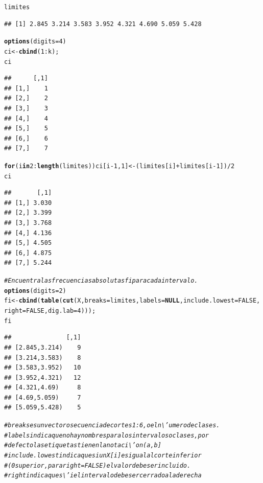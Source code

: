 \documentclass[12pt,letterpaper]{article}\usepackage[]{graphicx}\usepackage[]{color}
\makeatletter
\newcommand{\hlnum}[1]{\textcolor[rgb]{0.686,0.059,0.569}{#1}}%
\newcommand{\hlcom}[1]{\textcolor[rgb]{0.678,0.584,0.686}{\textit{#1}}}%
\newcommand{\hlopt}[1]{\textcolor[rgb]{0,0,0}{#1}}%
\newcommand{\hlstd}[1]{\textcolor[rgb]{0.345,0.345,0.345}{#1}}%
\newcommand{\hlkwa}[1]{\textcolor[rgb]{0.161,0.373,0.58}{\textbf{#1}}}%
\newcommand{\hlkwb}[1]{\textcolor[rgb]{0.69,0.353,0.396}{#1}}%
\newcommand{\hlkwc}[1]{\textcolor[rgb]{0.333,0.667,0.333}{#1}}%
\newcommand{\hlkwd}[1]{\textcolor[rgb]{0.737,0.353,0.396}{\textbf{#1}}}%
\newenvironment{kframe}{%
 \def\at@end@of@kframe{}%
 \ifinner\ifhmode%
  \def\at@end@of@kframe{\end{minipage}}%
  \begin{minipage}{\columnwidth}%
 \fi\fi%
 \def\FrameCommand##1{\hskip\@totalleftmargin \hskip-\fboxsep
 \colorbox{shadecolor}{##1}\hskip-\fboxsep
     \hskip-\linewidth \hskip-\@totalleftmargin \hskip\columnwidth}%
 \MakeFramed {\advance\hsize-\width
   \@totalleftmargin\z@ \linewidth\hsize
   \@setminipage}}%
 {\par\unskip\endMakeFramed%
 \at@end@of@kframe}
\newenvironment{knitrout}{}{} %
\makeatother
\begin{document}
\begin{knitrout}
\begin{kframe}
\begin{alltt}
\hlstd{limites}
\end{alltt}
\begin{verbatim}
## [1] 2.845 3.214 3.583 3.952 4.321 4.690 5.059 5.428
\end{verbatim}
\begin{alltt}
\hlkwd{options}\hlstd{(}\hlkwc{digits}\hlstd{=}\hlnum{4}\hlstd{)}
\hlstd{ci} \hlkwb{<-} \hlkwd{cbind}\hlstd{(}\hlnum{1}\hlopt{:}\hlstd{k);}
\hlstd{ci}
\end{alltt}
\begin{verbatim}
##      [,1]
## [1,]    1
## [2,]    2
## [3,]    3
## [4,]    4
## [5,]    5
## [6,]    6
## [7,]    7
\end{verbatim}
\begin{alltt}
\hlkwa{for}\hlstd{(i} \hlkwa{in} \hlnum{2}\hlopt{:}\hlkwd{length}\hlstd{(limites)) ci[i}\hlopt{-}\hlnum{1}\hlstd{,} \hlnum{1}\hlstd{]} \hlkwb{<-} \hlstd{(limites[i]} \hlopt{+} \hlstd{limites[i}\hlopt{-}\hlnum{1}\hlstd{])}\hlopt{/}\hlnum{2}
\hlstd{ci}
\end{alltt}
\begin{verbatim}
##       [,1]
## [1,] 3.030
## [2,] 3.399
## [3,] 3.768
## [4,] 4.136
## [5,] 4.505
## [6,] 4.875
## [7,] 5.244
\end{verbatim}
\begin{alltt}
\hlcom{# Encuentra las frecuencias absolutas fi para cada intervalo.}
\hlkwd{options}\hlstd{(}\hlkwc{digits}\hlstd{=}\hlnum{2}\hlstd{)}
\hlstd{fi} \hlkwb{<-} \hlkwd{cbind}\hlstd{(}\hlkwd{table}\hlstd{(}\hlkwd{cut}\hlstd{(X,} \hlkwc{breaks} \hlstd{= limites,} \hlkwc{labels}\hlstd{=}\hlkwa{NULL}\hlstd{,} \hlkwc{include.lowest}\hlstd{=}\hlnum{FALSE}\hlstd{,}
\hlkwc{right}\hlstd{=}\hlnum{FALSE}\hlstd{,} \hlkwc{dig.lab}\hlstd{=}\hlnum{4}\hlstd{)));}
\hlstd{fi}
\end{alltt}
\begin{verbatim}
##               [,1]
## [2.845,3.214)    9
## [3.214,3.583)    8
## [3.583,3.952)   10
## [3.952,4.321)   12
## [4.321,4.69)     8
## [4.69,5.059)     7
## [5.059,5.428)    5
\end{verbatim}
\begin{alltt}
\hlcom{# breaks es un vector o secuencia de cortes 1:6, o el n\textbackslash{}'umero de clases.}
\hlcom{# labels indica que no hay nombres para los intervalos o clases, por }
\hlcom{# defecto las etiquetas tienen la notaci\textbackslash{}'on (a, b]}
\hlcom{# include.lowest indica que si un X[i] es igual al corte inferior }
\hlcom{# (0 superior, para right=FALSE) el valor debe ser incluido.}
\hlcom{# right indica que s\textbackslash{}'i el intervalo debe ser cerrado a la derecha }

\end{alltt}
\end{kframe}
\end{knitrout}
\end{document}
